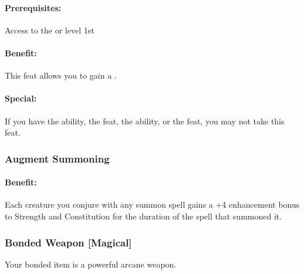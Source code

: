 \paragraph{Prerequisites:} Access to the  or  level 1st

\paragraph{Benefit:} This feat allows you to gain a .

\paragraph{Special:} If you have the  ability, the  feat, the  ability, or the  feat, you may not take this feat.

\subsubsection{Augment Summoning}
\label{Feat:AugmentSummoning}
\paragraph{Benefit:}
Each creature you conjure with any summon spell gains a +4 enhancement bonus to Strength and Constitution for the duration of the spell that summoned it.

\subsubsection[Bonded Weapon]{Bonded Weapon [Magical]}
\label{Feat:BondedWeapon}
Your bonded item is a powerful arcane weapon.
 
